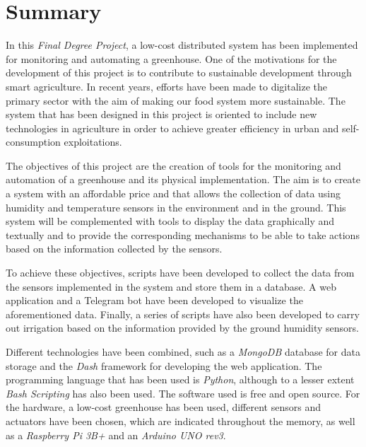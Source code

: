 \documentclass[a4paper, 12pt, oneside]{book}
\begin{document}

\chapter*{Summary}

In this \textit{Final Degree Project}, a low-cost distributed system has been implemented for monitoring and automating a greenhouse. One of the motivations for the development of this project is to contribute to sustainable development through smart agriculture. In recent years, efforts have been made to digitalize the primary sector with the aim of making our food system more sustainable. The system that has been designed in this project is oriented to include new technologies in agriculture in order to achieve greater efficiency in urban and self-consumption exploitations.

The objectives of this project are the creation of tools for the monitoring and automation of a greenhouse and its physical implementation. The aim is to create a system with an affordable price and that allows the collection of data using humidity and temperature sensors in the environment and in the ground. This system will be complemented with tools to display the data graphically and textually and to provide the corresponding mechanisms to be able to take actions based on the information collected by the sensors.

To achieve these objectives, scripts have been developed to collect the data from the sensors implemented in the system and store them in a database. A web application and a Telegram bot have been developed to visualize the aforementioned data. Finally, a series of scripts have also been developed to carry out irrigation based on the information provided by the ground humidity sensors.

Different technologies have been combined, such as a \textit{MongoDB} database for data storage and the \textit{Dash} framework for developing the web application.
The programming language that has been used is \textit{Python}, although to a lesser extent \textit{Bash Scripting} has also been used. The software used is free and open source. For the hardware, a low-cost greenhouse has been used, different sensors and actuators have been chosen, which are indicated throughout the memory, as well as a \textit{Raspberry Pi 3B+} and an \textit{Arduino UNO rev3}.
\end{document}
